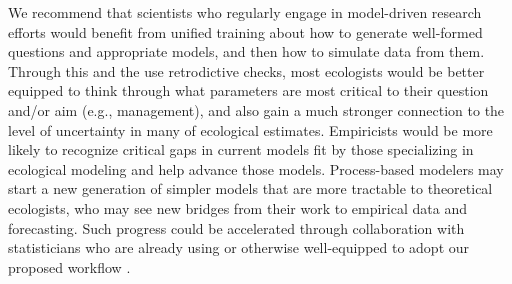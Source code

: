 \documentclass[11pt]{article}
\newcommand{\llabel}[1]{\hypertarget{lintarget:#1}{}\linelabel{lin:#1}}
\begin{document}
We recommend that scientists who regularly engage in model-driven research efforts would benefit from unified training about how to generate well-formed questions and appropriate models, and then how to simulate data from them. Through this and the use retrodictive checks, most ecologists would be better equipped to think through what parameters are most critical to their question and/or aim (e.g., management), and also gain a much stronger connection to the level of uncertainty in many of ecological estimates. Empiricists would be more likely to recognize critical gaps in current models fit by those specializing in ecological modeling and help advance those models. Process-based modelers may start a new generation of simpler models that are more tractable to theoretical ecologists, who may see new bridges from their work to empirical data and forecasting. \llabel{collab}Such progress could be accelerated through collaboration with statisticians who are already using or otherwise well-equipped to adopt our proposed workflow \citep{betanworkflow,Gelman2020, grinsztajn2021,vandeschoot2021}. %

\end{document}
